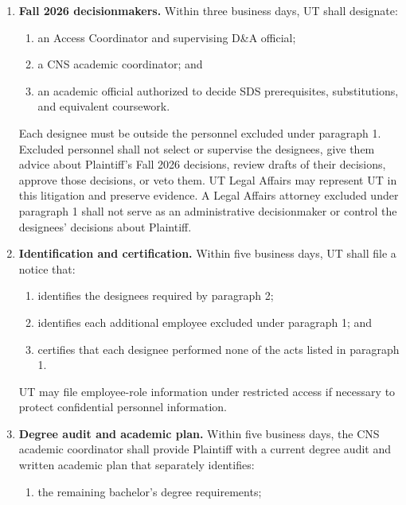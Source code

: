 \documentclass[12pt]{article}
\begin{document}
\begin{enumerate}
\item \textbf{Fall 2026 decisionmakers.} Within three business days, UT shall designate:

  \begin{enumerate}[label=(\alph*),leftmargin=0.45in]
  \item an Access Coordinator and supervising D\&A official;

  \item a CNS academic coordinator; and

  \item an academic official authorized to decide SDS prerequisites, substitutions, and equivalent coursework.
  \end{enumerate}

Each designee must be outside the personnel excluded under paragraph 1. Excluded personnel shall not select or supervise the designees, give them advice about Plaintiff's Fall 2026 decisions, review drafts of their decisions, approve those decisions, or veto them. UT Legal Affairs may represent UT in this litigation and preserve evidence. A Legal Affairs attorney excluded under paragraph 1 shall not serve as an administrative decisionmaker or control the designees' decisions about Plaintiff.

\item \textbf{Identification and certification.} Within five business days, UT shall file a notice that:

  \begin{enumerate}[label=(\alph*),leftmargin=0.45in]
  \item identifies the designees required by paragraph 2;

  \item identifies each additional employee excluded under paragraph 1; and

  \item certifies that each designee performed none of the acts listed in paragraph 1.
  \end{enumerate}

UT may file employee-role information under restricted access if necessary to protect confidential personnel information.

\item \textbf{Degree audit and academic plan.} Within five business days, the CNS academic coordinator shall provide Plaintiff with a current degree audit and written academic plan that separately identifies:

  \begin{enumerate}[label=(\alph*),leftmargin=0.45in]
  \item the remaining bachelor's degree requirements;


\end{enumerate}
\end{enumerate}
\end{document}
